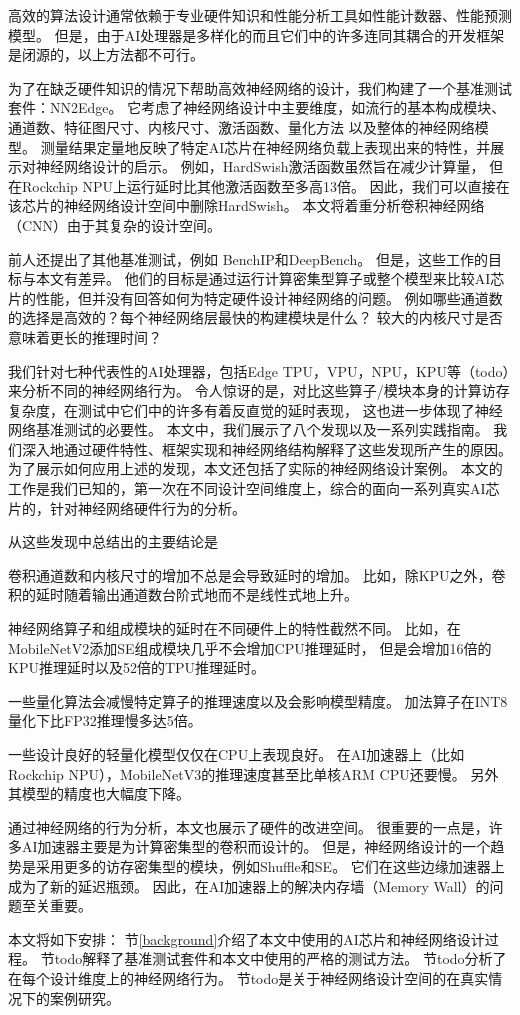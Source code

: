 高效的算法设计通常依赖于专业硬件知识和性能分析工具如性能计数器、性能预测模型。
但是，由于AI处理器是多样化的而且它们中的许多连同其耦合的开发框架是闭源的，以上方法都不可行。

为了在缺乏硬件知识的情况下帮助高效神经网络的设计，我们构建了一个基准测试套件：NN2Edge。
它考虑了神经网络设计中主要维度，如流行的基本构成模块、通道数、特征图尺寸、内核尺寸、激活函数、量化方法
以及整体的神经网络模型。
测量结果定量地反映了特定AI芯片在神经网络负载上表现出来的特性，并展示对神经网络设计的启示。
例如，HardSwish\cite{howard2019searching}激活函数虽然旨在减少计算量，
但在Rockchip NPU\cite{rk3399pro}上运行延时比其他激活函数至多高13倍。
因此，我们可以直接在该芯片的神经网络设计空间中删除HardSwish。
本文将着重分析卷积神经网络（CNN）由于其复杂的设计空间。

前人还提出了其他基准测试，例如
BenchIP\cite{tao2017benchip}和DeepBench\cite{deepbench}。
但是，这些工作的目标与本文有差异。
他们的目标是通过运行计算密集型算子或整个模型来比较AI芯片的性能，但并没有回答如何为特定硬件设计神经网络的问题。
例如哪些通道数的选择是高效的？每个神经网络层最快的构建模块是什么？
较大的内核尺寸是否意味着更长的推理时间？

我们针对七种代表性的AI处理器，包括Edge TPU，VPU，NPU，KPU等（todo）来分析不同的神经网络行为。
令人惊讶的是，对比这些算子/模块本身的计算访存复杂度，在测试中它们中的许多有着反直觉的延时表现，
这也进一步体现了神经网络基准测试的必要性。
本文中，我们展示了八个发现以及一系列实践指南。
我们深入地通过硬件特性、框架实现和神经网络结构解释了这些发现所产生的原因。
为了展示如何应用上述的发现，本文还包括了实际的神经网络设计案例。
本文的工作是我们已知的，第一次在不同设计空间维度上，综合的面向一系列真实AI芯片的，针对神经网络硬件行为的分析。

从这些发现中总结出的主要结论是
\begin{enumerate*}
    \item 卷积通道数和内核尺寸的增加不总是会导致延时的增加。
    比如，除KPU之外，卷积的延时随着输出通道数台阶式地而不是线性式地上升。
    \item 神经网络算子和组成模块的延时在不同硬件上的特性截然不同。
    比如，在MobileNetV2添加SE\cite{hu2018squeeze}组成模块几乎不会增加CPU推理延时，
    但是会增加16倍的KPU推理延时以及52倍的TPU推理延时。
    \item 一些量化算法会减慢特定算子的推理速度以及会影响模型精度。
    加法算子在INT8量化下比FP32推理慢多达5倍。
    \item 一些设计良好的轻量化模型仅仅在CPU上表现良好。
    在AI加速器上（比如Rockchip NPU），MobileNetV3的推理速度甚至比单核ARM CPU还要慢。
    另外其模型的精度也大幅度下降。
\end{enumerate*}

通过神经网络的行为分析，本文也展示了硬件的改进空间。
很重要的一点是，许多AI加速器主要是为计算密集型的卷积而设计的。
但是，神经网络设计的一个趋势是采用更多的访存密集型的模块，例如Shuffle和SE。
它们在这些边缘加速器上成为了新的延迟瓶颈。
因此，在AI加速器上的解决内存墙（Memory Wall）的问题至关重要。

本文将如下安排：
节\ref{background}介绍了本文中使用的AI芯片和神经网络设计过程。
节todo解释了基准测试套件和本文中使用的严格的测试方法。
节todo分析了在每个设计维度上的神经网络行为。
节todo是关于神经网络设计空间的在真实情况下的案例研究。
